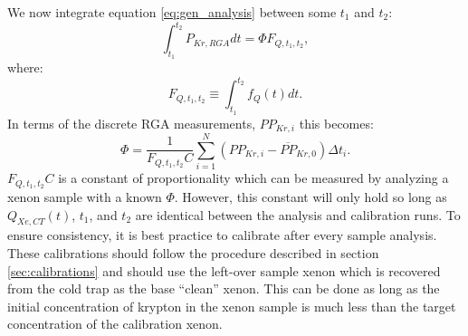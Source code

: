 \documentclass[12pt]{article}
\begin{document}
We now integrate equation \ref{eq:gen_analysis} between some $t_1$ and $t_2$:
\begin{equation}
\int_{t_1}^{t_2}P_{Kr,RGA}dt=\Phi F_{Q,t_1,t_2},
\end{equation}
where:
\begin{equation}
F_{Q,t_1,t_2}\equiv \int_{t_1}^{t_2}f_{Q}(t) dt.
\end{equation}
In terms of the discrete RGA measurements, $PP_{Kr,i}$ this becomes:
\begin{equation}
\label{eq:int_analysis}
\Phi=\frac{1}{F_{Q,t_1,t_2}C}\sum_{i=1}^{N} (PP_{Kr,i}-\overline{PP}_{Kr,0})\Delta t_i.
\end{equation}
$F_{Q,t_1,t_2}C$ is a constant of proportionality which can be measured by analyzing a xenon sample with a known $\Phi$. However, this constant will only hold so long as $Q_{Xe,CT}(t)$, $t_1$, and $t_2$ are identical between the analysis and calibration runs. To ensure consistency, it is best practice to calibrate after every sample analysis. These calibrations should follow the procedure described in section \ref{sec:calibrations} and should use the left-over sample xenon which is recovered from the cold trap as the base ``clean'' xenon. This can be done as long as the initial concentration of krypton in the xenon sample is much less than the target concentration of the calibration xenon.
\end{document}
